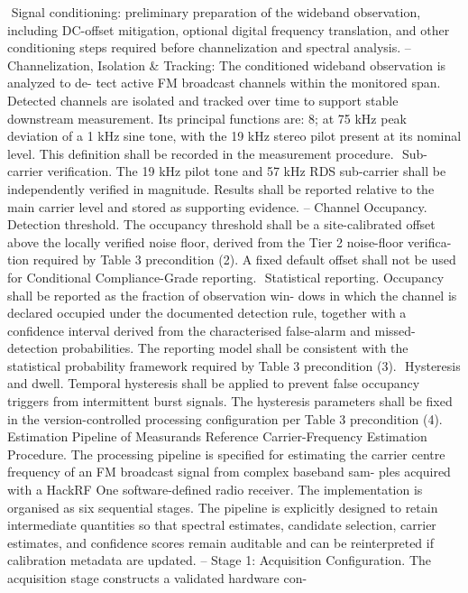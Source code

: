 \documentclass[11pt,a4paper]{article}
\begin{document}
{\begin{itemize}
  Signal  conditioning:   preliminary  preparation  of  the  wideband  observation,  including
DC-offset mitigation, optional digital frequency translation, and other conditioning steps
required before channelization and spectral analysis.
– Channelization, Isolation \& Tracking:  The conditioned wideband observation is analyzed to de-
tect active FM broadcast channels within the monitored span.  Detected channels are isolated
and tracked over time to support stable downstream measurement.
Its principal functions are:
8; at 75 kHz peak deviation of a 1 kHz sine tone, with the 19 kHz stereo pilot present at
its nominal level.  This definition shall be recorded in the measurement procedure.
  Sub-carrier  verification.   The  19  kHz  pilot  tone  and  57  kHz  RDS  sub-carrier  shall  be
independently  verified  in  magnitude.   Results  shall  be  reported  relative  to  the  main
carrier level and stored as supporting evidence.
– Channel Occupancy.  Detection threshold. The occupancy threshold shall be a site-calibrated
offset above the locally verified noise floor, derived from the Tier 2 noise-floor verifica-
tion required by Table 3 precondition (2).  A fixed default offset shall not be used for
Conditional Compliance-Grade reporting.
  Statistical  reporting.   Occupancy shall  be  reported  as  the  fraction of  observation  win-
dows in which the channel is declared occupied under the documented detection rule,
together with a confidence interval derived from the characterised false-alarm and missed-
detection  probabilities.   The  reporting  model  shall  be  consistent  with  the  statistical
probability framework required by Table 3 precondition (3).
  Hysteresis  and  dwell.  Temporal hysteresis shall be applied to prevent false occupancy
triggers from intermittent burst signals.  The hysteresis parameters shall be fixed in the
version-controlled processing configuration per Table 3 precondition (4).
Estimation Pipeline of Measurands
Reference Carrier-Frequency Estimation Procedure.    The processing pipeline is specified
for estimating the carrier centre frequency of an FM broadcast signal from complex baseband sam-
ples acquired with a HackRF One software-defined radio receiver.  The implementation is organised
as six sequential stages.  The pipeline is explicitly designed to retain intermediate quantities so that
spectral estimates, candidate selection, carrier estimates, and confidence scores remain auditable
and can be reinterpreted if calibration metadata are updated.
– Stage 1:  Acquisition Configuration.  The acquisition stage constructs a validated hardware con-

\end{itemize}}
\end{document}
